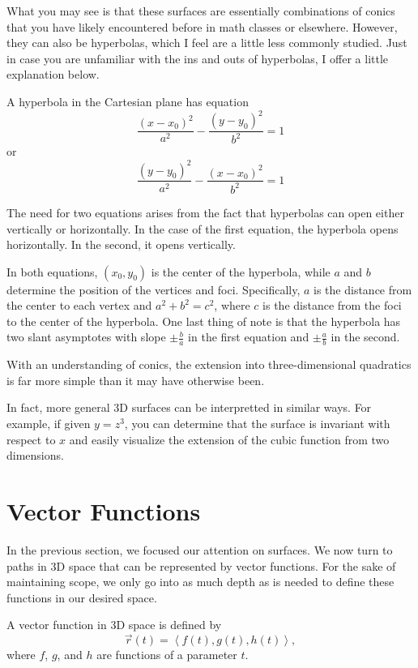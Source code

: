 What you may see is that these surfaces are essentially combinations of conics that you have likely encountered before in math classes or elsewhere. However, they can also be hyperbolas, which I feel are a little less commonly studied. Just in case you are unfamiliar with the ins and outs of hyperbolas, I offer a little explanation below.

\begin{definition}
    A hyperbola in the Cartesian plane has equation
    \[\frac{(x - x_{0})^{2}}{a^{2}} - \frac{(y - y_{0})^{2}}{b^{2}} = 1\]
    or
    \[\frac{(y - y_{0})^{2}}{a^{2}} - \frac{(x - x_{0})^{2}}{b^{2}} = 1\]
\end{definition}

The need for two equations arises from the fact that hyperbolas can open either vertically or horizontally. In the case of the first equation, the hyperbola opens horizontally. In the second, it opens vertically.

In both equations, $(x_{0}, y_{0})$ is the center of the hyperbola, while $a$ and $b$ determine the position of the vertices and foci. Specifically, $a$ is the distance from the center to each vertex and $a^{2} + b^{2} = c^{2}$, where $c$ is the distance from the foci to the center of the hyperbola. One last thing of note is that the hyperbola has two slant asymptotes with slope $\pm\frac{b}{a}$ in the first equation and $\pm\frac{a}{b}$ in the second.

With an understanding of conics, the extension into three-dimensional quadratics is far more simple than it may have otherwise been.

In fact, more general 3D surfaces can be interpretted in similar ways. For example, if given $y = z^{3}$, you can determine that the surface is invariant with respect to $x$ and easily visualize the extension of the cubic function from two dimensions.

\section{Vector Functions}

In the previous section, we focused our attention on surfaces. We now turn to paths in 3D space that can be represented by vector functions. For the sake of maintaining scope, we only go into as much depth as is needed to define these functions in our desired space.

\begin{definition}
    A vector function in 3D space is defined by
    \[\vec{r}(t) = \left<f(t), g(t), h(t)\right>,\]
    where $f$, $g$, and $h$ are functions of a parameter $t$.
\end{definition}

